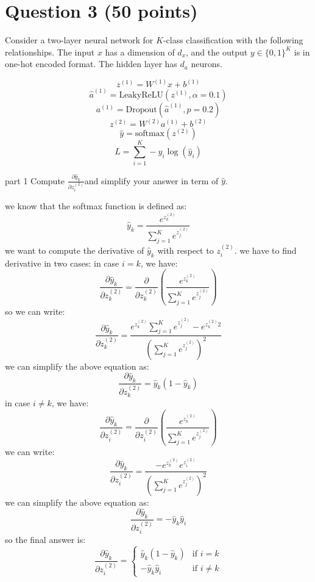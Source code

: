 \section{Question 3 (50 points)}
Consider a two-layer neural network for \( K \)-class classification with the following relationships. The input \( x \) has a dimension of \( d_x \), and the output \( y \in \{0,1\}^K \) is in one-hot encoded format. The hidden layer has \( d_a \) neurons.

\[
z^{(1)} = W^{(1)} x + b^{(1)}
\]
\[
\hat{a}^{(1)} = \text{LeakyReLU}(z^{(1)}, \alpha = 0.1)
\]
\[
a^{(1)} = \text{Dropout}(\hat{a}^{(1)}, p = 0.2)
\]
\[
z^{(2)} = W^{(2)} a^{(1)} + b^{(2)}
\]
\[
\hat{y} = \text{softmax}(z^{(2)})
\]
\[
L = \sum_{i=1}^{K} -y_i \log(\hat{y}_i)
\]
\begin{subsection}{part 1}
Compute  $\frac{\partial \hat{y}_k }{\partial z_i^{(2)}}$and simplify your answer in term of $\hat{y}$.
\begin{qsolve}
	\begin{qsolve}[]
		we know that the softmax function is defined as:
		\[
		\hat{y}_k = \frac{e^{z_k^{(2)}}}{\sum_{j=1}^K e^{z_j^{(2)}}}
		\]
		we want to compute the derivative of \( \hat{y}_k \) with respect to \( z_i^{(2)} \). we have to find derivative in two cases:
		in case \( i = k \), we have:
		\[
		\frac{\partial \hat{y}_k}{\partial z_k^{(2)}} = \frac{\partial}{\partial z_k^{(2)}} \left( \frac{e^{z_k^{(2)}}}{\sum_{j=1}^K e^{z_j^{(2)}}} \right)
		\]
		so we can write:
		\[
		\frac{\partial \hat{y}_k}{\partial z_k^{(2)}} = \frac{e^{z_k^{(2)}} \sum_{j=1}^K e^{z_j^{(2)}} - e^{z_k^{(2)}2}}{\left( \sum_{j=1}^K e^{z_j^{(2)}} \right)^2}
		\]
		we can simplify the above equation as:
		\[
		\frac{\partial \hat{y}_k}{\partial z_k^{(2)}} = \hat{y}_k \left( 1 - \hat{y}_k \right)
		\]
		in case \( i \neq k \), we have:
		\splitqsolve[\splitqsolve]
		\[
		\frac{\partial \hat{y}_k}{\partial z_i^{(2)}} = \frac{\partial}{\partial z_i^{(2)}} \left( \frac{e^{z_k^{(2)}}}{\sum_{j=1}^K e^{z_j^{(2)}}} \right)
		\]
		we can write:
		\[
		\frac{\partial \hat{y}_k}{\partial z_i^{(2)}} = \frac{-e^{z_k^{(2)}} e^{z_i^{(2)}}}{\left( \sum_{j=1}^K e^{z_j^{(2)}} \right)^2}
		\]
		we can simplify the above equation as:
		\[
		\frac{\partial \hat{y}_k}{\partial z_i^{(2)}} = -\hat{y}_k \hat{y}_i
		\]
		so the final answer is:
		\[
		\frac{\partial \hat{y}_k}{\partial z_i^{(2)}} = \begin{cases}
			\hat{y}_k \left( 1 - \hat{y}_k \right) & \text{if } i = k\\
			-\hat{y}_k \hat{y}_i & \text{if } i \neq k
		\end{cases}
		\]
	\end{qsolve}
\end{qsolve}

\end{subsection}

